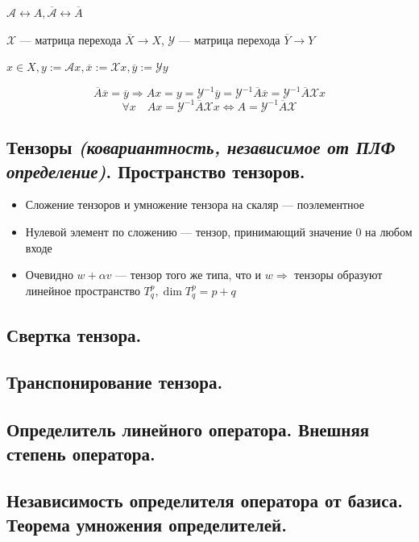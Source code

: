 $\mathcal A \leftrightarrow A, \overline{\mathcal A} \leftrightarrow \overline A$

$\mathcal X$ --- матрица перехода $\overline X\to X$, $\mathcal Y$ --- матрица перехода $\overline Y\to Y$

$x\in X, y:=\mathcal A x, \overline x := \mathcal X x, \overline y := \mathcal Y y$

$$\overline A \overline x = \overline y \Rightarrow A x = y = \mathcal Y^{-1} \overline y = \mathcal Y^{-1} \overline A \overline x = \mathcal Y^{-1} \overline A \mathcal X x$$
$$\forall x \quad Ax = \mathcal Y^{-1} \overline A \mathcal X x \Leftrightarrow A = \mathcal Y^{-1} \overline A \mathcal X$$

\subsection{Тензоры \textit{(ковариантность, независимое от ПЛФ определение)}. Пространство тензоров.}
\begin{itemize}
    \item Сложение тензоров и умножение тензора на скаляр --- поэлементное
    \item Нулевой элемент по сложению --- тензор, принимающий значение $0$ на любом входе
    \item Очевидно $w + \alpha v$ --- тензор того же типа, что и $w \Rightarrow$ тензоры образуют линейное пространство $T^p_q, \dim T^p_q = p + q$
\end{itemize}

\subsection{Свертка тензора.}

\subsection{Транспонирование тензора.}

\subsection{Определитель линейного оператора. Внешняя степень оператора.}

\subsection{Независимость определителя оператора от базиса. Теорема умножения определителей.}

